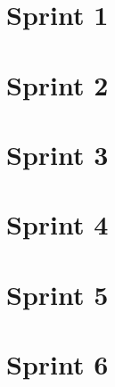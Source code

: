 \section{Sprint 1}
    
    
\section{Sprint 2}
    
    
\section{Sprint 3}
    

\section{Sprint 4}
    
    
\section{Sprint 5}
    
    
\section{Sprint 6}
    
